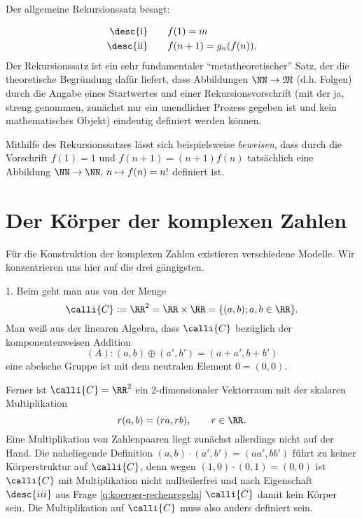 \begin{antwort} Der allgemeine Rekursionssatz besagt:

  \medskip\noindent
  \begin{align*}
    \text{\desc{i}} &\qquad  f(1)=m \\
    \text{\desc{ii}} &\qquad  f(n+1)= g_n(f(n)).
  \end{align*} 
  Der Rekursionssatz ist ein sehr fundamentaler 
  "`metatheoretischer"' Satz, der die theoretische 
  Begründung dafür liefert, dass Abbildungen  
  $\NN \to \mathfrak{M}$ (d.h. Folgen) durch die Angabe eines Startwertes und 
  einer Rekursionsvorschrift (mit der ja, streng genommen, zunächst nur ein 
  unendlicher Prozess gegeben ist und kein mathematisches Objekt)
  eindeutig definiert werden können. 

  Mithilfe des Rekursionssatzes lässt sich beispielsweise \textit{beweisen},
  dass durch die Vorschrift $
  f(1) = 1$ und $f(n+1)=(n+1) f(n)$ 
  tatsächlich eine Abbildung $\NN \to \NN, \, n\mapsto f(n)=n!$ definiert ist.
  \AntEnd
\end{antwort}




\section{Der Körper der komplexen Zahlen}



Für die Konstruktion der komplexen Zahlen existieren verschiedene Modelle. 
Wir konzentrieren uns hier auf die drei gängigsten. 

1. Beim  geht man aus von der Menge 
\[
\calli{C} := \RR^2 = \RR \times \RR = \{(a,b) ; a,b \in \RR\}.
\]
Man weiß aus der linearen Algebra, dass $\calli{C}$ bezüglich der 
komponentenweisen Addition 
\[
(A) : (a,b) \oplus (a',b') = (a+a', b+ b') 
\]
eine abelsche Gruppe ist mit dem neutralen Element $0 = (0,0)$. 

Ferner ist $\calli{C} = \RR^2$ ein 
2-dimensionaler Vektorraum mit der skalaren Multiplikation 
\[
r(a,b) = (ra,rb),\qquad r\in\RR.
\]
Eine Multiplikation von Zahlenpaaren liegt zunächst allerdings nicht auf 
der Hand. Die naheliegende Definition $(a,b) \cdot (a',b') = (aa',bb')$ 
führt zu keiner Körperstruktur auf $\calli{C}$, denn wegen 
$(1,0)\cdot(0,1)=(0,0)$ ist $\calli{C}$ mit 
 Multiplikation nicht nullteilerfrei und 
nach Eigenschaft $\desc{iii}$ aus Frage \ref{q:koerper-rechenregeln}  
$\calli{C}$ damit kein Körper sein. Die Multiplikation auf $\calli{C}$ muss 
also anders definiert sein.

